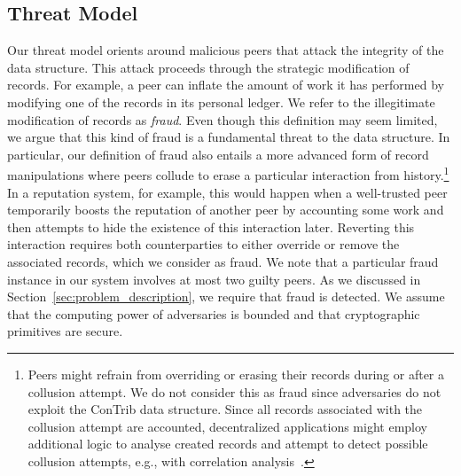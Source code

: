 \subsection{Threat Model}
\label{sec:threat_model}
Our threat model orients around malicious peers that attack the integrity of the \TrustChain{} data structure.
This attack proceeds through the strategic modification of \TrustChain{} records.
For example, a peer can inflate the amount of work it has performed by modifying one of the records in its personal ledger.
We refer to the illegitimate modification of \TrustChain{} records as \emph{fraud}.
Even though this definition may seem limited, we argue that this kind of fraud is a fundamental threat to the \TrustChain{} data structure.
In particular, our definition of fraud also entails a more advanced form of record manipulations where peers collude to erase a particular interaction from history.\footnote{Peers might refrain from overriding or erasing their records during or after a collusion attempt. We do not consider this as fraud since adversaries do not exploit the ConTrib data structure. Since all records associated with the collusion attempt are accounted, decentralized applications might employ additional logic to analyse created records and attempt to detect possible collusion attempts, e.g., with correlation analysis~\cite{liu2008detection}.}
In a reputation system, for example, this would happen when a well-trusted peer temporarily boosts the reputation of another peer by accounting some work and then attempts to hide the existence of this interaction later.
Reverting this interaction requires both counterparties to either override or remove the associated records, which we consider as fraud.
We note that a particular fraud instance in our system involves at most two guilty peers.
As we discussed in Section~\ref{sec:problem_description}, we require that fraud is detected.
We assume that the computing power of adversaries is bounded and that cryptographic primitives are secure.




